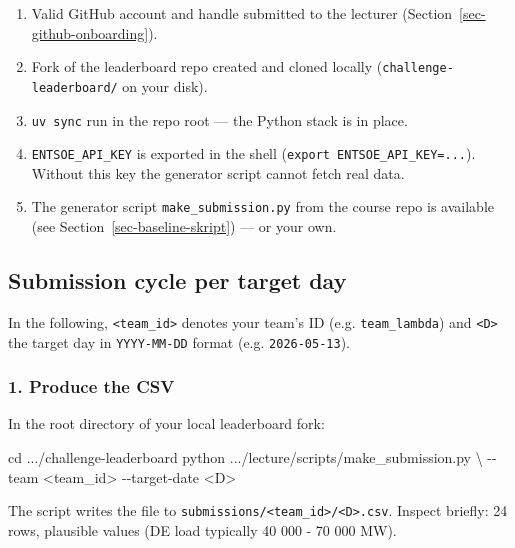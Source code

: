 \documentclass[
  english,
  letterpaper,
]{scrbook}
\newenvironment{Shaded}{\begin{snugshade}}{\end{snugshade}}
\newcommand{\AttributeTok}[1]{\textcolor[rgb]{0.40,0.45,0.13}{#1}}
\newcommand{\BuiltInTok}[1]{\textcolor[rgb]{0.00,0.23,0.31}{#1}}
\newcommand{\DataTypeTok}[1]{\textcolor[rgb]{0.68,0.00,0.00}{#1}}
\newcommand{\ExtensionTok}[1]{\textcolor[rgb]{0.00,0.23,0.31}{#1}}
\newcommand{\NormalTok}[1]{\textcolor[rgb]{0.00,0.23,0.31}{#1}}
\newcommand{\OperatorTok}[1]{\textcolor[rgb]{0.37,0.37,0.37}{#1}}
\providecommand{\tightlist}{%
  \setlength{\itemsep}{0pt}\setlength{\parskip}{0pt}}
\begin{document}
\begin{enumerate}
\def\labelenumi{\arabic{enumi}.}
\tightlist
\item
  Valid GitHub account and handle submitted to the lecturer
  (Section~\ref{sec-github-onboarding}).
\item
  Fork of the leaderboard repo created and cloned locally
  (\texttt{challenge-leaderboard/} on your disk).
\item
  \texttt{uv\ sync} run in the repo root --- the Python stack is in
  place.
\item
  \texttt{ENTSOE\_API\_KEY} is exported in the shell
  (\texttt{export\ ENTSOE\_API\_KEY=...}). Without this key the
  generator script cannot fetch real data.
\item
  The generator script \texttt{make\_submission.py} from the course repo
  is available (see Section~\ref{sec-baseline-skript}) --- or your own.
\end{enumerate}

\subsection{Submission cycle per target
day}\label{submission-cycle-per-target-day}

In the following, \texttt{\textless{}team\_id\textgreater{}} denotes
your team's ID (e.g. \texttt{team\_lambda}) and
\texttt{\textless{}D\textgreater{}} the target day in
\texttt{YYYY-MM-DD} format (e.g. \texttt{2026-05-13}).

\subsubsection{1. Produce the CSV}\label{produce-the-csv}

In the root directory of your local leaderboard fork:

\begin{Shaded}
\begin{Highlighting}[]
\BuiltInTok{cd}\NormalTok{ .../challenge{-}leaderboard}
\ExtensionTok{python}\NormalTok{ .../lecture/scripts/make\_submission.py }\DataTypeTok{\textbackslash{}}
    \AttributeTok{{-}{-}team} \OperatorTok{\textless{}}\NormalTok{team\_id}\OperatorTok{\textgreater{}}\NormalTok{ {-}{-}target{-}date }\OperatorTok{\textless{}}\NormalTok{D}\OperatorTok{\textgreater{}}
\end{Highlighting}
\end{Shaded}

The script writes the file to
\texttt{submissions/\textless{}team\_id\textgreater{}/\textless{}D\textgreater{}.csv}.
Inspect briefly: 24 rows, plausible values (DE load typically 40 000 -
70 000 MW).
\end{document}
